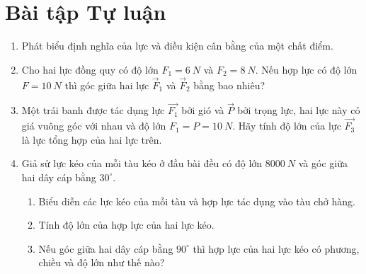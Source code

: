 \section{Bài tập Tự luận}
\begin{enumerate}[label=\bfseries Bài \arabic*:]
	\item {}
	
	{
		Phát biểu định nghĩa của lực và điều kiện cân bằng của một chất điểm.
	}
	
	\item {}
	
	{
		Cho hai lực đồng quy có độ lớn $F_1 = \SI{6}{N}$ và $F_2 = \SI{8}{N}$. Nếu hợp lực có độ lớn $F = \SI{10}{N}$ thì góc giữa hai lực $\vec F_1$ và $\vec F_2$ bằng bao nhiêu?
	}
	
	
	\item {}
	
	{ Một trái banh được tác dụng lực $\vec{F_1}$ bởi gió và $\vec{P}$ bởi trọng lực, hai lực này có giá vuông góc với nhau và độ lớn $F_1=P=\SI{10}{N}$. Hãy tính độ lớn của lực $\vec{F_3}$ là lực tổng hợp của hai lực trên.
		
	}
	\item {}
	
	{Giả sử lực kéo của mỗi tàu kéo ở đầu bài đều có độ lớn $\SI{8000}{N}$ và góc giữa hai dây cáp bằng $30^\circ$. 
		\begin{enumerate}[label=\alph*)]
			\item Biểu diễn các lực kéo của mỗi tàu và hợp lực tác dụng vào tàu chở hàng.
			\item Tính độ lớn của hợp lực của hai lực kéo.
			\item Nếu góc giữa hai dây cáp bằng $90^\circ$ thì hợp lực của hai lực kéo có phương, chiều và độ lớn như thế nào?
		\end{enumerate}
		
}
\end{enumerate}
